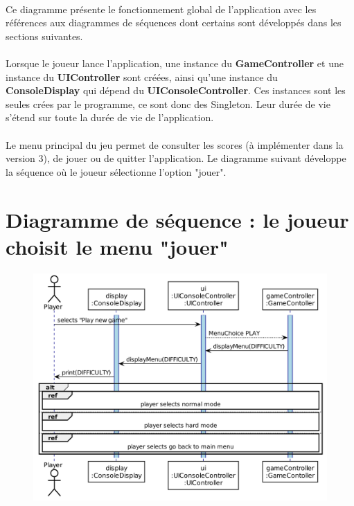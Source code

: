 \documentclass{article}
\begin{document}
    \paragraph{}
    Ce diagramme présente le fonctionnement global de l'application avec les références aux diagrammes de séquences dont certains sont développés dans les sections suivantes.

    \paragraph{}
    Lorsque le joueur lance l'application, une instance du \textbf{GameController} et une instance du \textbf{UIController} sont créées, ainsi qu'une instance du \textbf{ConsoleDisplay} qui dépend du \textbf{UIConsoleController}. Ces instances sont les seules crées par le programme, ce sont donc des Singleton. Leur durée de vie s'étend sur toute la durée de vie de l'application.

    \paragraph{}
    Le menu principal du jeu permet de consulter les scores (à implémenter dans la version 3), de jouer ou de quitter l'application. Le diagramme suivant développe la séquence où le joueur sélectionne l'option "jouer".


    \newpage
    \section{Diagramme de séquence : le joueur choisit le menu "jouer"}

    \begin{figure}[H]
        \centering
        \includegraphics[width=.8\linewidth]{./schemas/sequence2-player-selects-play.png}
    \end{figure}
\end{document}
